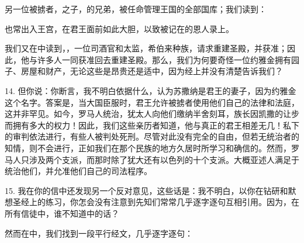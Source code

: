 另一位被掳者，之子，的兄弟，被任命管理王国的全部国库；我们读到：\par

也常出入王宫，在君王面前如此大胆，以致被记在的恩人录上。\par

我们又在中读到，，一位司酒官和太监，希伯来种族，请求重建圣殿，并获准；因此，他与许多人一同获准回去重建圣殿。那么，我们为何要奇怪一位约雅金拥有园子、房屋和财产，无论这些是昂贵还是适中，因为经上并没有清楚告诉我们？\par

14. 但你说：你断言，我不明白依据什么，认为苏撒纳是君王的妻子，因为约雅金这个名字。答案是，当大国臣服时，君王允许被掳者使用他们自己的法律和法庭，这并非罕见。如今，罗马人统治，犹太人向他们缴纳半舍刻耳，族长因凯撒的让步而拥有多大的权力！因此，我们这些亲历者知道，他与真正的君王相差无几！私下的审判依法进行，有些人被判处死刑。尽管对此没有完全的自由，但若无统治者的知情，则不会进行，正如我们在那个民族的地方久居时所学习和确信的。然而，罗马人只涉及两个支派，而那时除了犹大还有以色列的十个支派。大概亚述人满足于统治他们，并允准他们自己的司法程序。\par

15. 我在你的信中还发现另一个反对意见，这些话是：我不明白，以你在钻研和默想圣经上的练习，你怎会没有注意到先知们常常几乎逐字逐句互相引用。因为，在所有信徒中，谁不知道中的话？\par

然而在中，我们找到一段平行经文，几乎逐字逐句：\par

